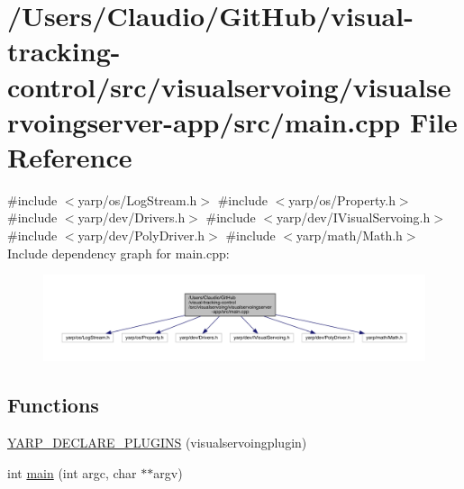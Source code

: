 \hypertarget{visualservoing_2visualservoingserver-app_2src_2main_8cpp}{}\section{/\+Users/\+Claudio/\+Git\+Hub/visual-\/tracking-\/control/src/visualservoing/visualservoingserver-\/app/src/main.cpp File Reference}
\label{visualservoing_2visualservoingserver-app_2src_2main_8cpp}
{\ttfamily \#include $<$yarp/os/\+Log\+Stream.\+h$>$}\newline
{\ttfamily \#include $<$yarp/os/\+Property.\+h$>$}\newline
{\ttfamily \#include $<$yarp/dev/\+Drivers.\+h$>$}\newline
{\ttfamily \#include $<$yarp/dev/\+I\+Visual\+Servoing.\+h$>$}\newline
{\ttfamily \#include $<$yarp/dev/\+Poly\+Driver.\+h$>$}\newline
{\ttfamily \#include $<$yarp/math/\+Math.\+h$>$}\newline
Include dependency graph for main.\+cpp\+:
\nopagebreak
\begin{figure}[H]
\begin{center}
\leavevmode
\includegraphics[width=350pt]{visualservoing_2visualservoingserver-app_2src_2main_8cpp__incl}
\end{center}
\end{figure}
\subsection*{Functions}
\begin{DoxyCompactItemize}
\item 
\hyperlink{visualservoing_2visualservoingserver-app_2src_2main_8cpp_ab543f1556358acb521438f7c30e19de2}{Y\+A\+R\+P\+\_\+\+D\+E\+C\+L\+A\+R\+E\+\_\+\+P\+L\+U\+G\+I\+NS} (visualservoingplugin)
\item 
int \hyperlink{visualservoing_2visualservoingserver-app_2src_2main_8cpp_a3c04138a5bfe5d72780bb7e82a18e627}{main} (int argc, char $\ast$$\ast$argv)
\end{DoxyCompactItemize}


